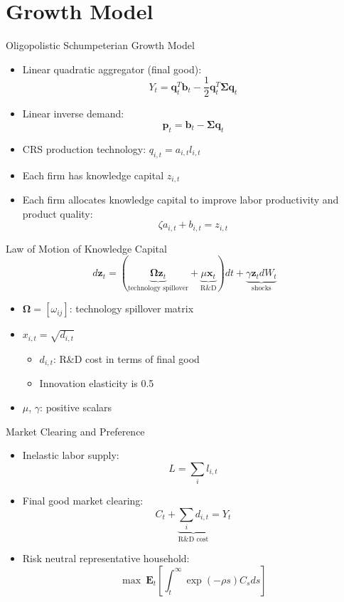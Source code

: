 \documentclass[
  aspectratio=169,  %
  handout           %
]{beamer}
\theoremstyle{plain}
\begin{document}
\section{Growth Model}
\begin{frame}{Oligopolistic Schumpeterian Growth Model}

  \begin{itemize}
    \item Linear quadratic aggregator (final good):
          \[
            Y_{t}=\symbf{q}_{t}^{T}\symbf{b}_{t}-\frac{1}{2}\symbf{q}_{t}^{T}\symbf{\Sigma}\symbf{q}_{t}
          \]
    \item Linear inverse demand:
          \[
            \symbf{p}_{t}=\symbf{b}_{t}-\symbf{\Sigma}\symbf{q}_{t}
          \]
    \item CRS production technology: $q_{i,t}=a_{i,t}l_{i,t}$\medskip{}
    \item Each firm has knowledge capital $z_{i,t}$\medskip{}
    \item Each firm allocates knowledge capital to improve labor productivity
          and product quality:
          \[
            \zeta a_{i,t}+b_{i,t}=z_{i,t}
          \]
  \end{itemize}
\end{frame}
%
\begin{frame}{Law of Motion of Knowledge Capital}
  \[
    d\symbf{z}_{t}=\left(\underbrace{\symbf{\Omega}\symbf{z}_{t}}_{\text{technology spillover}}+\underbrace{\mu\symbf{x}_{t}}_{\text{R\&D}}\right)dt+\underbrace{\gamma\symbf{z}_{t}dW_{t}}_{\text{shocks}}
  \]
  \begin{itemize}
    \item $\symbf{\Omega}=\left[\omega_{ij}\right]$: technology spillover matrix\medskip{}
    \item $x_{i,t}=\sqrt{d_{i,t}}$
          \begin{itemize}
            \item $d_{i,t}$: R\&D cost in terms of final good
            \item Innovation elasticity is 0.5\medskip{}
          \end{itemize}
    \item $\mu$, $\gamma$: positive scalars
  \end{itemize}
\end{frame}
%
\begin{frame}{Market Clearing and Preference}
  \begin{itemize}
    \item Inelastic labor supply:
          \[
            L=\sum_{i}l_{i,t}
          \]
    \item Final good market clearing:
          \[
            C_{t}+\underbrace{\sum_{i}d_{i,t}}_{\text{R\&D cost}}=Y_{t}
          \]
    \item Risk neutral representative household:
          \[
            \max\ \symbf{E}_{t}\left[\int_{t}^{\infty}\exp\left(-\rho s\right)C_{s}ds\right]
          \]
  \end{itemize}
\end{frame}
%
\end{document}
